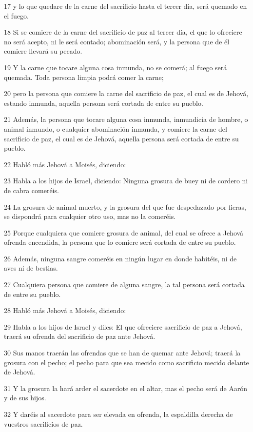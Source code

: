 \par 17 y lo que quedare de la carne del sacrificio hasta el tercer día, será quemado en el fuego.
\par 18 Si se comiere de la carne del sacrificio de paz al tercer día, el que lo ofreciere no será acepto, ni le será contado; abominación será, y la persona que de él comiere llevará su pecado.
\par 19 Y la carne que tocare alguna cosa inmunda, no se comerá; al fuego será quemada. Toda persona limpia podrá comer la carne;
\par 20 pero la persona que comiere la carne del sacrificio de paz, el cual es de Jehová, estando inmunda, aquella persona será cortada de entre su pueblo.
\par 21 Además, la persona que tocare alguna cosa inmunda, inmundicia de hombre, o animal inmundo, o cualquier abominación inmunda, y comiere la carne del sacrificio de paz, el cual es de Jehová, aquella persona será cortada de entre su pueblo.
\par 22 Habló más Jehová a Moisés, diciendo:
\par 23 Habla a los hijos de Israel, diciendo: Ninguna grosura de buey ni de cordero ni de cabra comeréis.
\par 24 La grosura de animal muerto, y la grosura del que fue despedazado por fieras, se dispondrá para cualquier otro uso, mas no la comeréis.
\par 25 Porque cualquiera que comiere grosura de animal, del cual se ofrece a Jehová ofrenda encendida, la persona que lo comiere será cortada de entre su pueblo.
\par 26 Además, ninguna sangre comeréis en ningún lugar en donde habitéis, ni de aves ni de bestias.
\par 27 Cualquiera persona que comiere de alguna sangre, la tal persona será cortada de entre su pueblo.
\par 28 Habló más Jehová a Moisés, diciendo:
\par 29 Habla a los hijos de Israel y diles: El que ofreciere sacrificio de paz a Jehová, traerá su ofrenda del sacrificio de paz ante Jehová.
\par 30 Sus manos traerán las ofrendas que se han de quemar ante Jehová; traerá la grosura con el pecho; el pecho para que sea mecido como sacrificio mecido delante de Jehová.
\par 31 Y la grosura la hará arder el sacerdote en el altar, mas el pecho será de Aarón y de sus hijos.
\par 32 Y daréis al sacerdote para ser elevada en ofrenda, la espaldilla derecha de vuestros sacrificios de paz.
